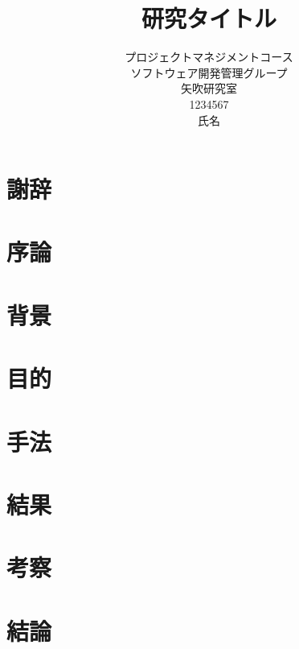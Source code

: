 \title{研究タイトル}
\author{プロジェクトマネジメントコース\\
ソフトウェア開発管理グループ\\
矢吹研究室\\
1234567\\
氏名}
\date{}

\maketitle

\chapter*{謝辞}

\tableofcontents%

\chapter{序論}

\chapter{背景}

\chapter{目的}

\chapter{手法}

\chapter{結果}

\chapter{考察}

\chapter{結論}

